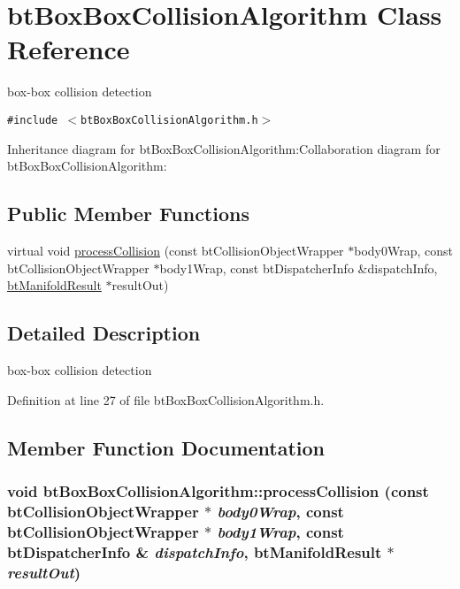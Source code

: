 \hypertarget{classbt_box_box_collision_algorithm}{
\section{btBoxBoxCollisionAlgorithm Class Reference}
\label{classbt_box_box_collision_algorithm}
}
box-box collision detection  


{\tt \#include $<$btBoxBoxCollisionAlgorithm.h$>$}

Inheritance diagram for btBoxBoxCollisionAlgorithm:Collaboration diagram for btBoxBoxCollisionAlgorithm:\subsection*{Public Member Functions}
\begin{CompactItemize}
\item 
virtual void \hyperlink{classbt_box_box_collision_algorithm_adde989098617a7679a8d907f4144adb}{processCollision} (const btCollisionObjectWrapper $\ast$body0Wrap, const btCollisionObjectWrapper $\ast$body1Wrap, const btDispatcherInfo \&dispatchInfo, \hyperlink{classbt_manifold_result}{btManifoldResult} $\ast$resultOut)
\end{CompactItemize}


\subsection{Detailed Description}
box-box collision detection 

Definition at line 27 of file btBoxBoxCollisionAlgorithm.h.

\subsection{Member Function Documentation}
\hypertarget{classbt_box_box_collision_algorithm_adde989098617a7679a8d907f4144adb}{
\subsubsection[processCollision]{\setlength{\rightskip}{0pt plus 5cm}void btBoxBoxCollisionAlgorithm::processCollision (const btCollisionObjectWrapper $\ast$ {\em body0Wrap}, \/  const btCollisionObjectWrapper $\ast$ {\em body1Wrap}, \/  const btDispatcherInfo \& {\em dispatchInfo}, \/  {\bf btManifoldResult} $\ast$ {\em resultOut})}}
\label{classbt_box_box_collision_algorithm_adde989098617a7679a8d907f4144adb}




